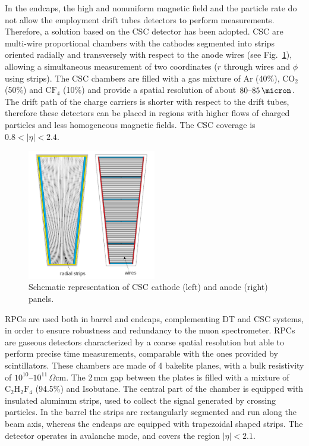 In the endcaps, the high and nonuniform magnetic field and the particle rate do not allow the employment drift tubes detectors to perform measurements. Therefore, a solution based on the CSC detector has been adopted. CSC are multi-wire proportional chambers with the cathodes segmented into strips oriented radially and transversely with respect to the anode wires (see Fig.~\ref{fig:csc}), allowing a simultaneous measurement of two coordinates ($r$ through wires and $\phi$ using strips). The CSC chambers are filled with a gas mixture of Ar (40\%), $\mathrm{CO_2}$ (50\%) and $\mathrm{CF_4}$ (10\%) and provide a spatial resolution of about $80\mbox{--}85\,\micron$.
The drift path of the charge carriers is shorter with respect to the drift tubes, therefore these detectors can be placed in regions with higher flows of charged particles and less homogeneous magnetic fields. The CSC coverage is $0.8 < |\eta| < 2.4$.
\begin{figure}[htb]
\centering
\includegraphics[width=0.5\textwidth]{images/csc.png}
\caption{Schematic representation of CSC cathode (left) and anode (right) panels.}\label{fig:csc}
\end{figure}

RPCs are used both in barrel and endcaps, complementing DT and CSC systems, in order to ensure robustness and redundancy to the muon spectrometer.
RPCs are gaseous detectors characterized by a coarse spatial resolution but able to perform precise time measurements, comparable with the ones provided by scintillators. These chambers are made of 4 bakelite planes, with a bulk resistivity of $10^{10}\mbox{--}10^{11}\,\Omega$cm. The 2\,mm gap between the plates is filled with a mixture of $\mathrm{C_2 H_2 F_4}$ (94.5\%) and Isobutane. 
The central part of the chamber is equipped with insulated aluminum strips, used to collect the signal generated by crossing particles. In the barrel the strips are rectangularly segmented and run along the beam axis, whereas the endcaps are equipped with trapezoidal shaped strips. The detector operates in avalanche mode, and covers the region $|\eta|<2.1$.

